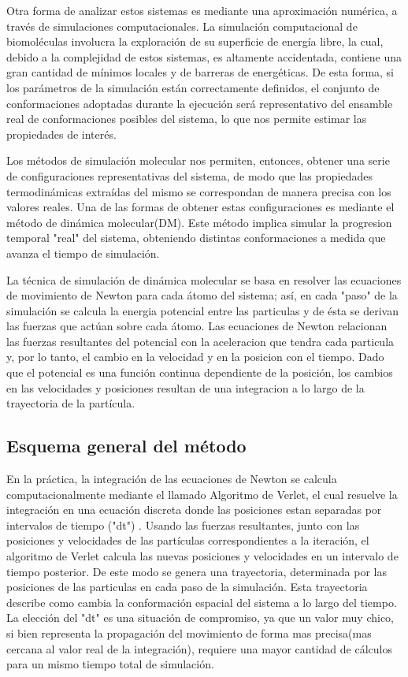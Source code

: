 \documentclass[a4paper,10pt]{report}
\begin{document}
Otra forma de analizar estos sistemas es mediante una aproximación numérica, a través de simulaciones computacionales.  	
La simulación computacional de biomoléculas involucra la exploración de su superficie de energía libre, la cual, debido a la complejidad de estos sistemas, es altamente accidentada, contiene una gran cantidad de mínimos locales y de barreras de energéticas. 
De esta forma, si los parámetros de la simulación están correctamente definidos, el conjunto de conformaciones adoptadas durante la ejecución será representativo del ensamble real de conformaciones posibles del sistema, lo que nos permite estimar las propiedades de interés.

Los métodos de simulación molecular nos permiten, entonces, obtener una serie de configuraciones representativas del sistema, de modo que las propiedades termodinámicas extraídas del mismo se correspondan de manera precisa con los valores reales.
Una de las formas de obtener estas configuraciones es mediante el método de dinámica molecular(DM). Este método implica simular la progresion temporal "real" del sistema, obteniendo distintas conformaciones a medida que avanza el tiempo de simulación.

La técnica de simulación de dinámica molecular se basa en resolver las ecuaciones de movimiento de Newton para cada átomo del sistema; así, en cada "paso" de la simulación se calcula la energia potencial entre las particulas y de ésta se derivan las fuerzas que actúan sobre cada átomo. 
Las ecuaciones de Newton relacionan las fuerzas resultantes del potencial con la aceleracion que tendra cada particula y, por lo tanto, el cambio en la velocidad y en la posicion con el tiempo. 
Dado que el potencial es una función continua dependiente de la posición, los cambios en las velocidades y posiciones resultan de una integracion a lo largo de la trayectoria de la partícula.


\subsection{Esquema general del método}

En la práctica, la integración de las ecuaciones de Newton se calcula computacionalmente mediante el llamado Algoritmo de Verlet, el cual resuelve la integración en una ecuación discreta donde las posiciones estan separadas por intervalos de tiempo ("dt") . 
Usando las fuerzas resultantes, junto con las posiciones y velocidades de las partículas correspondientes a la iteración, el algoritmo de Verlet calcula las nuevas posiciones y velocidades en un intervalo de tiempo posterior. De este modo se genera una trayectoria, determinada por las posiciones de las particulas en cada paso de la simulación. 
Esta trayectoria describe como cambia la conformación espacial del sistema a lo largo del tiempo. 
La elección del "dt" es una situación de compromiso, ya que un valor muy chico, si bien representa la propagación del movimiento de forma mas precisa(mas cercana al valor real de la integración), requiere una mayor cantidad de cálculos para un mismo tiempo total de simulación. 
\end{document}

